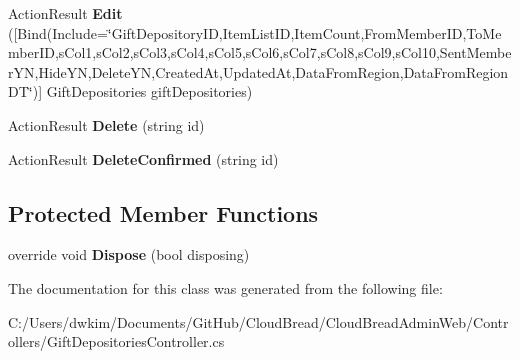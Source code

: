 \begin{DoxyCompactItemize}
\item 
Action\+Result {\bfseries Edit} (\mbox{[}Bind(Include=\char`\"{}Gift\+Depository\+ID,Item\+List\+ID,Item\+Count,From\+Member\+ID,To\+Member\+ID,s\+Col1,s\+Col2,s\+Col3,s\+Col4,s\+Col5,s\+Col6,s\+Col7,s\+Col8,s\+Col9,s\+Col10,Sent\+Member\+YN,Hide\+YN,Delete\+YN,Created\+At,Updated\+At,Data\+From\+Region,Data\+From\+Region\+DT\char`\"{})\mbox{]} Gift\+Depositories gift\+Depositories)\hypertarget{a00087_acf856e4f0533f5e578ad1549b0a297e2}{}\label{a00087_acf856e4f0533f5e578ad1549b0a297e2}

\item 
Action\+Result {\bfseries Delete} (string id)\hypertarget{a00087_a2c4e695e78da9e766126ea5369bc6dfe}{}\label{a00087_a2c4e695e78da9e766126ea5369bc6dfe}

\item 
Action\+Result {\bfseries Delete\+Confirmed} (string id)\hypertarget{a00087_a61fc8612e2273fbd328624e99823ba0d}{}\label{a00087_a61fc8612e2273fbd328624e99823ba0d}

\end{DoxyCompactItemize}
\subsection*{Protected Member Functions}
\begin{DoxyCompactItemize}
\item 
override void {\bfseries Dispose} (bool disposing)\hypertarget{a00087_a1e31b97188c2acb720bc826db28a93e7}{}\label{a00087_a1e31b97188c2acb720bc826db28a93e7}

\end{DoxyCompactItemize}


The documentation for this class was generated from the following file\+:\begin{DoxyCompactItemize}
\item 
C\+:/\+Users/dwkim/\+Documents/\+Git\+Hub/\+Cloud\+Bread/\+Cloud\+Bread\+Admin\+Web/\+Controllers/Gift\+Depositories\+Controller.\+cs\end{DoxyCompactItemize}

